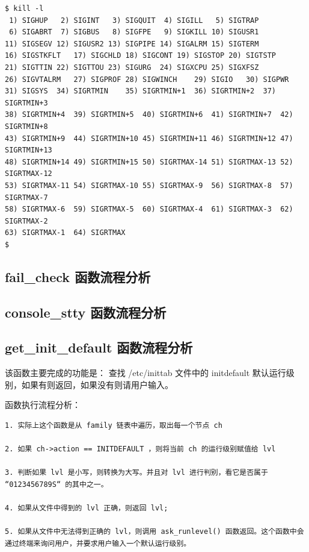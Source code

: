 {\begin{shaded}\begin{verbatim}
$ kill -l
 1) SIGHUP   2) SIGINT   3) SIGQUIT  4) SIGILL   5) SIGTRAP
 6) SIGABRT  7) SIGBUS   8) SIGFPE   9) SIGKILL 10) SIGUSR1
11) SIGSEGV 12) SIGUSR2 13) SIGPIPE 14) SIGALRM 15) SIGTERM
16) SIGSTKFLT   17) SIGCHLD 18) SIGCONT 19) SIGSTOP 20) SIGTSTP
21) SIGTTIN 22) SIGTTOU 23) SIGURG  24) SIGXCPU 25) SIGXFSZ
26) SIGVTALRM   27) SIGPROF 28) SIGWINCH    29) SIGIO   30) SIGPWR
31) SIGSYS  34) SIGRTMIN    35) SIGRTMIN+1  36) SIGRTMIN+2  37) SIGRTMIN+3
38) SIGRTMIN+4  39) SIGRTMIN+5  40) SIGRTMIN+6  41) SIGRTMIN+7  42) SIGRTMIN+8
43) SIGRTMIN+9  44) SIGRTMIN+10 45) SIGRTMIN+11 46) SIGRTMIN+12 47) SIGRTMIN+13
48) SIGRTMIN+14 49) SIGRTMIN+15 50) SIGRTMAX-14 51) SIGRTMAX-13 52) SIGRTMAX-12
53) SIGRTMAX-11 54) SIGRTMAX-10 55) SIGRTMAX-9  56) SIGRTMAX-8  57) SIGRTMAX-7
58) SIGRTMAX-6  59) SIGRTMAX-5  60) SIGRTMAX-4  61) SIGRTMAX-3  62) SIGRTMAX-2
63) SIGRTMAX-1  64) SIGRTMAX    
$ 
\end{verbatim}\end{shaded}}
\subsection{fail\_check 函数流程分析}

\subsection{console\_stty 函数流程分析}

\subsection{get\_init\_default 函数流程分析}

该函数主要完成的功能是： 查找 /etc/inittab 文件中的 initdefault
默认运行级别，如果有则返回，如果没有则请用户输入。

函数执行流程分析：

{\begin{shaded}\begin{verbatim}
1. 实际上这个函数是从 family 链表中遍历，取出每一个节点 ch

2. 如果 ch->action == INITDEFAULT ，则将当前 ch 的运行级别赋值给 lvl

3. 判断如果 lvl 是小写，则转换为大写。并且对 lvl 进行判别，看它是否属于 “0123456789S“ 的其中之一。

4. 如果从文件中得到的 lvl 正确，则返回 lvl; 

5. 如果从文件中无法得到正确的 lvl，则调用 ask_runlevel() 函数返回。这个函数中会通过终端来询问用户，并要求用户输入一个默认运行级别。
\end{verbatim}\end{shaded}}
